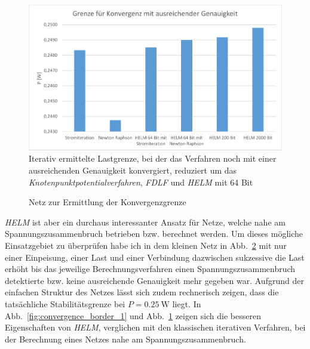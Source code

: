 \documentclass[12pt,a4paper]{article}
\newcommand{\reffig}[1]{{Abb.~\ref{#1}}}
\begin{document}
	\begin{figure}
		\centering
		\includegraphics[scale=0.8]{pictures/convergence_border_2}
		\caption{Iterativ ermittelte Lastgrenze, bei der das Verfahren noch mit einer ausreichenden Genauigkeit konvergiert, reduziert um das \emph{Knotenpunktpotentialverfahren}, \emph{FDLF} und \emph{HELM} mit 64 Bit}
		\label{fig:convergence_border_2}
	\end{figure}
	
	\begin{figure}
		\centering
		
		\caption{Netz zur Ermittlung der Konvergenzgrenze}
		\label{fig:two_node_net}
	\end{figure}
	
	\emph{HELM} ist aber ein durchaus interessanter Ansatz für Netze, welche nahe am Spannungszusammenbruch betrieben bzw. berechnet werden. Um dieses mögliche Einsatzgebiet zu überprüfen habe ich in dem kleinen Netz in \reffig{fig:two_node_net} mit nur einer Einpeisung, einer Last und einer Verbindung dazwischen sukzessive die Last erhöht bis das jeweilige Berechnungsverfahren einen Spannungszusammenbruch detektierte bzw. keine ausreichende Genauigkeit mehr gegeben war. Aufgrund der einfachen Struktur des Netzes lässt sich zudem rechnerisch zeigen, dass die tatsächliche Stabilitätsgrenze bei $P = \SI{0.25}{\watt}$ liegt. In \reffig{fig:convergence_border_1} und \reffig{fig:convergence_border_2} zeigen sich die besseren Eigenschaften von \emph{HELM}, verglichen mit den klassischen iterativen Verfahren, bei der Berechnung eines Netzes nahe am Spannungszusammenbruch.
	
\end{document}

